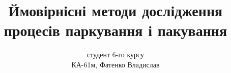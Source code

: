 \author{студент 6-го курсу\\ КА-61м, Фатенко Владислав}
\title[Узагальнення моделі паркування Реньї]{Ймовірнісні методи дослідження процесів паркування і пакування}
\date{}

